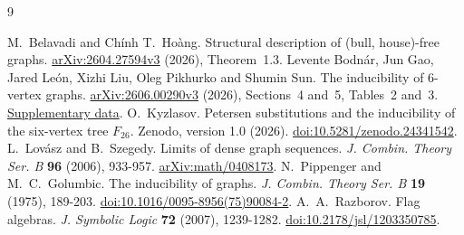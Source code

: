 \documentclass[11pt,a4paper]{article}
\begin{document}
\begin{thebibliography}{9}
\small\raggedright\setlength{\itemsep}{3pt}
 M.~Belavadi and Ch\'inh T.~Ho\`ang.
Structural description of (bull, house)-free graphs.
\href{https://arxiv.org/abs/2604.27594v3}{arXiv:2604.27594v3} (2026), Theorem~1.3.
 Levente Bodn\'ar, Jun Gao, Jared Le\'on, Xizhi Liu, Oleg Pikhurko and Shumin Sun.
The inducibility of 6-vertex graphs.
\href{https://arxiv.org/abs/2606.00290v3}{arXiv:2606.00290v3} (2026), Sections~4 and~5, Tables~2 and~3.
\href{https://github.com/bodnalev/supplementary_files/tree/9f356bb3dc10dcacd4d26a4eb1d556c2650e4e1b/graph_inducibility_6vtx}{Supplementary data}.
 O.~Kyzlasov. Petersen substitutions and the inducibility
of the six-vertex tree \(F_{26}\). Zenodo, version 1.0 (2026).
\href{https://doi.org/10.5281/zenodo.24341542}{doi:10.5281/zenodo.24341542}.
 L.~Lov\'asz and B.~Szegedy. Limits of dense graph sequences.
\emph{J. Combin. Theory Ser. B} \textbf{96} (2006), 933-957.
\href{https://arxiv.org/abs/math/0408173}{arXiv:math/0408173}.
 N.~Pippenger and M.~C.~Golumbic. The inducibility of graphs.
\emph{J. Combin. Theory Ser. B} \textbf{19} (1975), 189-203.
\href{https://doi.org/10.1016/0095-8956(75)90084-2}{doi:10.1016/0095-8956(75)90084-2}.
 A.~A.~Razborov. Flag algebras.
\emph{J. Symbolic Logic} \textbf{72} (2007), 1239-1282.
\href{https://doi.org/10.2178/jsl/1203350785}{doi:10.2178/jsl/1203350785}.
\end{thebibliography}
\end{document}
